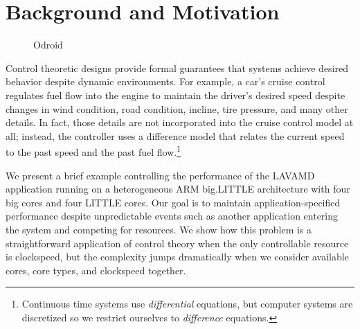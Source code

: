 \section{Background and Motivation}
\label{sec:example}

\begin{figure}
 \label{fig:odroidall}
 \caption{Odroid}
\end{figure}

Control theoretic designs provide formal guarantees that systems
achieve desired behavior despite dynamic environments. For example, a
car's cruise control regulates fuel flow into the engine to maintain
the driver's desired speed despite changes in wind condition, road
condition, incline, tire pressure, and many other details.  In fact,
those details are not incorporated into the cruise control model at
all; instead, the controller uses a difference model that relates the
current speed to the past speed and the past fuel
flow.\footnote{Continuous time systems use \emph{differential}
  equations, but computer systems are discretized so we restrict
  ourselves to \emph{difference} equations.}

We present a brief example controlling the performance of the LAVAMD
application running on a heterogeneous ARM big.LITTLE architecture
with four big cores and four LITTLE cores.  Our goal is to maintain
application-specified performance despite unpredictable events such as
another application entering the system and competing for resources.
We show how this problem is a straightforward application of control
theory when the only controllable resource is clockspeed, but the
complexity jumps dramatically when we consider available cores, core
types, and clockspeed together.


